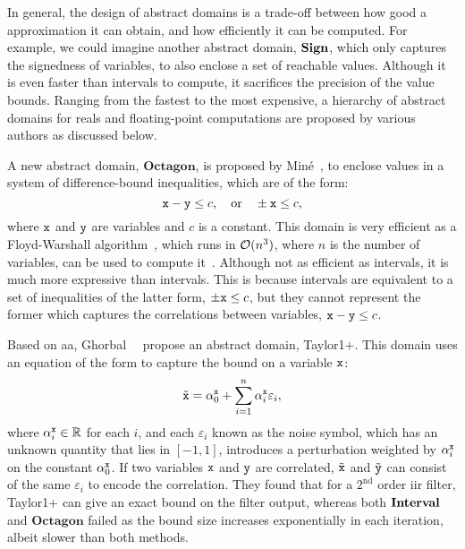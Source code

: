In general, the design of abstract domains is a trade-off between how good
a approximation it can obtain, and how efficiently it can be computed.  For
example, we could imagine another abstract domain, $\mathbf{Sign}$, which only
captures the signedness of variables, to also enclose a set of reachable
values.  Although it is even faster than intervals to compute, it sacrifices
the precision of the value bounds.  Ranging from the fastest to the most
expensive, a hierarchy of abstract domains for reals and floating-point
computations are proposed by various authors as discussed below.

A new abstract domain, $\mathbf{Octagon}$, is proposed by Min\'e~\cite{mine07},
to enclose values in a system of difference-bound inequalities, which are of
the form:
\begin{equation}
    \texttt{x} - \texttt{y} \leq c, \quad \text{or} \quad
    \pm \texttt{x} \leq c,
\end{equation}
where $\texttt{x}$ and $\texttt{y}$ are variables and $c$ is a constant.  This domain
is very efficient as a Floyd-Warshall algorithm~\cite{floyd62}, which runs in
$\operatorname{\mathcal{O}}(n^3)$, where $n$ is the number of variables, can be used to compute
it~\cite{mine04}.  Although not as efficient as intervals, it is much more
expressive than intervals.  This is because intervals are equivalent to a
set of inequalities of the latter form, $\pm \texttt{x} \leq c$, but they cannot
represent the former which captures the correlations between variables, $\texttt{x}
- \texttt{y} \leq c$.

Based on \gls{aa}, Ghorbal~\etal~\cite{ghorbal09} propose an abstract domain,
Taylor1+\@.  This domain uses an equation of the form to capture the bound on a
variable $\texttt{x}$:
\begin{equation}
    \tilde{\texttt{x}} =
        \alpha^{\texttt{x}}_0 + \sum_{i = 1}^{n} \alpha^{\texttt{x}}_i \varepsilon_i,
\end{equation}
where $\alpha^{\texttt{x}}_i \in \mathbb{R}$ for each $i$, and each $\varepsilon_i$
known as the noise symbol, which has an unknown quantity that lies in $[-1,
1]$, introduces a perturbation weighted by $\alpha^{\texttt{x}}_i$ on the constant
$\alpha^{\texttt{x}}_0$.  If two variables $\texttt{x}$ and $\texttt{y}$ are correlated,
$\tilde{\texttt{x}}$ and $\tilde{\texttt{y}}$ can consist of the same $\varepsilon_i$ to
encode the correlation.  They found that for a $2^\mathrm{nd}$ order \gls{iir}
filter, Taylor1+ can give an exact bound on the filter output, whereas both
$\mathbf{Interval}$ and $\mathbf{Octagon}$ failed as the bound size increases
exponentially in each iteration, albeit slower than both methods.

